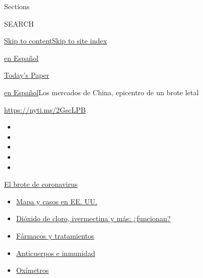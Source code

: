 Sections

SEARCH

\protect\hyperlink{site-content}{Skip to
content}\protect\hyperlink{site-index}{Skip to site index}

\href{https://www.nytimes.com/es/}{en Español}

\href{https://myaccount.nytimes.com/auth/login?response_type=cookie\&client_id=vi}{}

\href{https://www.nytimes.com/section/todayspaper}{Today's Paper}

\href{/es/}{en Español}\textbar{}Los mercados de China, epicentro de un
brote letal

\url{https://nyti.ms/2GscLPB}

\begin{itemize}
\item
\item
\item
\item
\item
\end{itemize}

\href{https://www.nytimes.com/es/spotlight/coronavirus?action=click\&pgtype=Article\&state=default\&region=TOP_BANNER\&context=storylines_menu}{El
brote de coronavirus}

\begin{itemize}
\tightlist
\item
  \href{https://www.nytimes.com/es/interactive/2020/espanol/mundo/coronavirus-en-estados-unidos.html?action=click\&pgtype=Article\&state=default\&region=TOP_BANNER\&context=storylines_menu}{Mapa
  y casos en EE. UU.}
\item
  \href{https://www.nytimes.com/es/2020/07/23/espanol/america-latina/bolivia-cloro-coronavirus-ivermectina.html?action=click\&pgtype=Article\&state=default\&region=TOP_BANNER\&context=storylines_menu}{Dióxido
  de cloro, ivermectina y más: ¿funcionan?}
\item
  \href{https://www.nytimes.com/es/interactive/2020/science/coronavirus-tratamientos-curas.html?action=click\&pgtype=Article\&state=default\&region=TOP_BANNER\&context=storylines_menu}{Fármacos
  y tratamientos}
\item
  \href{https://www.nytimes.com/es/2020/07/28/espanol/ciencia-y-tecnologia/anticuerpos-coronavirus-inmunidad.html?action=click\&pgtype=Article\&state=default\&region=TOP_BANNER\&context=storylines_menu}{Anticuerpos
  e inmunidad}
\item
  \href{https://www.nytimes.com/es/2020/04/29/espanol/estilos-de-vida/oximetro-para-que-sirve.html?action=click\&pgtype=Article\&state=default\&region=TOP_BANNER\&context=storylines_menu}{Oxímetros}
\end{itemize}

